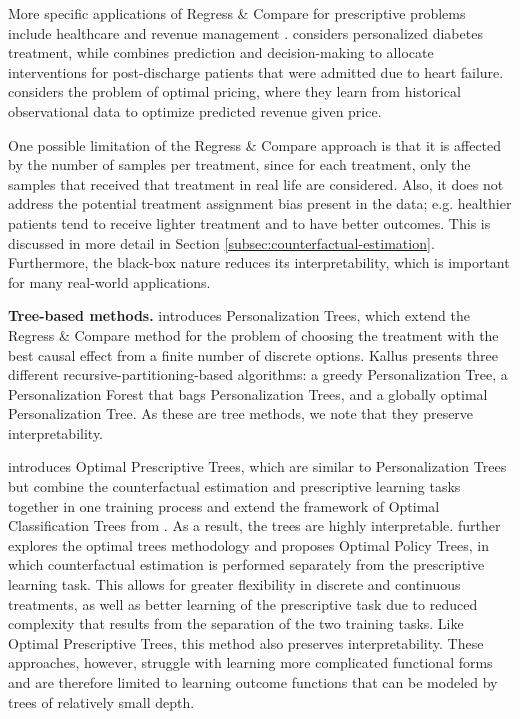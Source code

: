 \documentclass[10pt]{article} %
\begin{document}
More specific applications of Regress \& Compare for prescriptive problems include healthcare \citep{personalized-diabetes, heart-failure} and revenue management \citep{observational-data-pricing}. \citet{personalized-diabetes} considers personalized diabetes treatment, while \citet{heart-failure} combines prediction and decision-making to allocate interventions for post-discharge patients that were admitted due to heart failure. \citet{observational-data-pricing} considers the problem of optimal pricing, where they learn from historical observational data to optimize predicted revenue given price.

One possible limitation of the Regress \& Compare approach is that it is affected by the number of samples per treatment, since for each treatment, only the samples that received that treatment in real life are considered. Also, it does not address the potential treatment assignment bias present in the data; e.g. healthier patients tend to receive lighter treatment and to have better outcomes. This is discussed in more detail in Section \ref{subsec:counterfactual-estimation}. Furthermore, the black-box nature reduces its interpretability, which is important for many real-world applications.

\textbf{Tree-based methods.} \citet{recursive-partitioning} introduces Personalization Trees, which extend the Regress \& Compare method for the problem of choosing the treatment with the best causal effect from a finite number of discrete options. Kallus presents three different recursive-partitioning-based algorithms: a greedy Personalization Tree, a Personalization Forest that bags Personalization Trees, and a globally optimal Personalization Tree. As these are tree methods, we note that they preserve interpretability. 

\citet{optimal-prescriptive-trees} introduces Optimal Prescriptive Trees, which are similar to Personalization Trees but combine the counterfactual estimation and prescriptive learning tasks together in one training process and extend the framework of Optimal Classification Trees from \citet{optimal-classification-trees,MLbook}. As a result, the trees are highly interpretable. \citet{optimal-policy-trees} further explores the optimal trees methodology and proposes Optimal Policy Trees, in which counterfactual estimation is performed separately from the prescriptive learning task. This allows for greater flexibility in discrete and continuous treatments, as well as better learning of the prescriptive task due to reduced complexity that results from the separation of the two training tasks. Like Optimal Prescriptive Trees, this method also preserves interpretability. These approaches, however, struggle with learning more complicated functional forms and are therefore limited to learning outcome functions that can be modeled by trees of relatively small depth.
\end{document}

